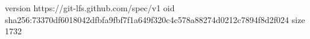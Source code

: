 version https://git-lfs.github.com/spec/v1
oid sha256:73370df6018042dfbfa9fbf7f1a649f320c4c578a88274d0212c7894f8d2f024
size 1732

